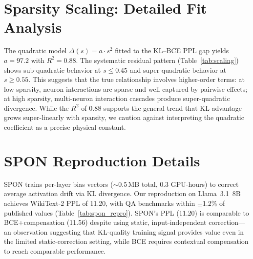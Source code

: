 \documentclass[11pt]{article}
\begin{document}
\appendix
\section{Sparsity Scaling: Detailed Fit Analysis}
\label{app:scaling}

The quadratic model $\Delta(s) = a \cdot s^2$ fitted to the KL--BCE PPL gap yields $a = 97.2$ with $R^2 = 0.88$. The systematic residual pattern (Table~\ref{tab:scaling}) shows sub-quadratic behavior at $s \leq 0.45$ and super-quadratic behavior at $s \geq 0.55$. This suggests that the true relationship involves higher-order terms: at low sparsity, neuron interactions are sparse and well-captured by pairwise effects; at high sparsity, multi-neuron interaction cascades produce super-quadratic divergence. While the $R^2$ of 0.88 supports the general trend that KL advantage grows super-linearly with sparsity, we caution against interpreting the quadratic coefficient as a precise physical constant.

\section{SPON Reproduction Details}
\label{app:spon}

SPON trains per-layer bias vectors (${\sim}$0.5\,MB total, 0.3 GPU-hours) to correct average activation drift via KL divergence. Our reproduction on Llama~3.1~8B achieves WikiText-2 PPL of 11.20, with QA benchmarks within $\pm$1.2\% of published values (Table~\ref{tab:spon_repro}). SPON's PPL (11.20) is comparable to BCE+compensation (11.56) despite using static, input-independent correction---an observation suggesting that KL-quality training signal provides value even in the limited static-correction setting, while BCE requires contextual compensation to reach comparable performance.




\end{document}
